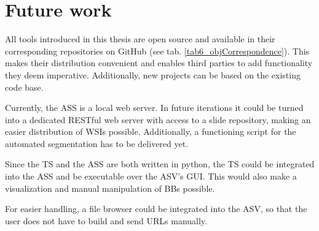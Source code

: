 \section{Future work}
All tools introduced in this thesis are open source and available in their corresponding repositories on GitHub (see tab. \ref{tab6_objCorrespondence}). This makes their distribution convenient and enables third parties to add functionality they deem imperative. Additionally, new projects can be based on the existing code base.

Currently, the ASS is a local web server. In future iterations it could be turned into a dedicated RESTful web server with access to a slide repository, making an easier distribution of WSIs possible. Additionally, a functioning script for the automated segmentation has to be delivered yet.

Since the TS and the ASS are both written in python, the TS could be integrated into the ASS and be executable over the ASV's GUI. This would also make a visualization and manual manipulation of BBs possible.

For easier handling, a file browser could be integrated into the ASV, so that the user does not have to build and send URLs manually.